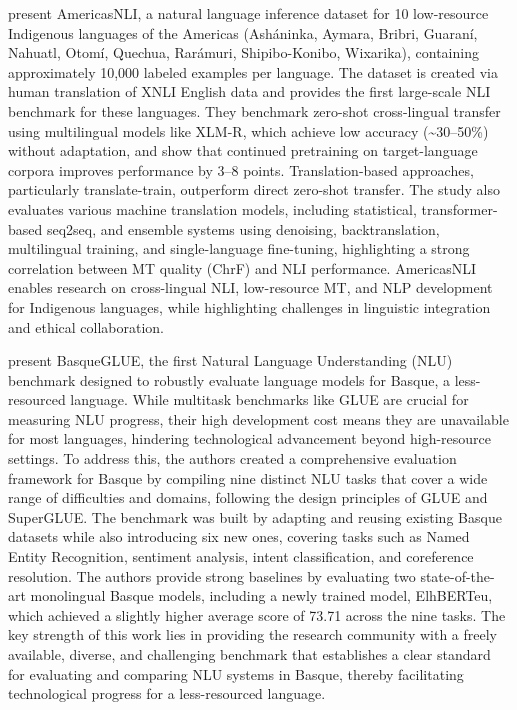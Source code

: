 \documentclass[acmsmall]{acmart}
\begin{document}
\citep{10.3389/frai.2022.995667} present AmericasNLI, a natural language inference dataset for 10 low-resource Indigenous languages of the Americas (Asháninka, Aymara, Bribri, Guaraní, Nahuatl, Otomí, Quechua, Rarámuri, Shipibo-Konibo, Wixarika), containing approximately 10,000 labeled examples per language. The dataset is created via human translation of XNLI English data and provides the first large-scale NLI benchmark for these languages. They benchmark zero-shot cross-lingual transfer using multilingual models like XLM-R, which achieve low accuracy (\textasciitilde30–50\%) without adaptation, and show that continued pretraining on target-language corpora improves performance by 3–8 points. Translation-based approaches, particularly translate-train, outperform direct zero-shot transfer. The study also evaluates various machine translation models, including statistical, transformer-based seq2seq, and ensemble systems using denoising, backtranslation, multilingual training, and single-language fine-tuning, highlighting a strong correlation between MT quality (ChrF) and NLI performance. AmericasNLI enables research on cross-lingual NLI, low-resource MT, and NLP development for Indigenous languages, while highlighting challenges in linguistic integration and ethical collaboration.

 \citep{urbizu2022basqueglue} present BasqueGLUE, the first Natural Language Understanding (NLU) benchmark designed to robustly evaluate language models for Basque, a less-resourced language. While multitask benchmarks like GLUE are crucial for measuring NLU progress, their high development cost means they are unavailable for most languages, hindering technological advancement beyond high-resource settings. To address this, the authors created a comprehensive evaluation framework for Basque by compiling nine distinct NLU tasks that cover a wide range of difficulties and domains, following the design principles of GLUE and SuperGLUE. The benchmark was built by adapting and reusing existing Basque datasets while also introducing six new ones, covering tasks such as Named Entity Recognition, sentiment analysis, intent classification, and coreference resolution. The authors provide strong baselines by evaluating two state-of-the-art monolingual Basque models, including a newly trained model, ElhBERTeu, which achieved a slightly higher average score of 73.71 across the nine tasks. The key strength of this work lies in providing the research community with a freely available, diverse, and challenging benchmark that establishes a clear standard for evaluating and comparing NLU systems in Basque, thereby facilitating technological progress for a less-resourced language.
\end{document}
